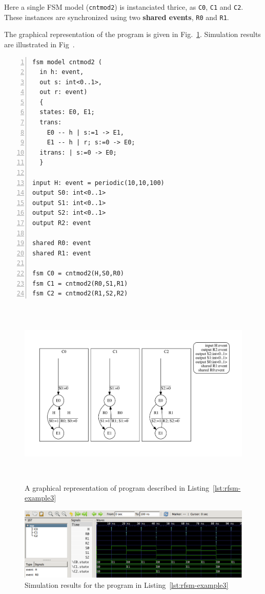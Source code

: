 \medskip
Here a single FSM model (\texttt{cntmod2}) is instanciated thrice, as \texttt{C0}, \texttt{C1} and
\texttt{C2}. These instances are synchronized using two \textbf{shared events}, \texttt{R0} and \texttt{R1}. 

\medskip
The graphical representation of the program is given in Fig.~\ref{fig:rfsm-example3-top}. Simulation
results are illustrated in Fig~\pageref{fig:rfsm-example3-vcd}. 

\begin{lstlisting}[language=Rfsm,frame=single,numbers=left,caption=A multi-model RFSM
  program,label={lst:rfsm-example3},float]
fsm model cntmod2 (
  in h: event,
  out s: int<0..1>,
  out r: event)
  {
  states: E0, E1;
  trans:
    E0 -- h | s:=1 -> E1,
    E1 -- h | r; s:=0 -> E0;
  itrans: | s:=0 -> E0;
  }

input H: event = periodic(10,10,100)
output S0: int<0..1>
output S1: int<0..1>
output S2: int<0..1>
output R2: event

shared R0: event
shared R1: event

fsm C0 = cntmod2(H,S0,R0) 
fsm C1 = cntmod2(R0,S1,R1) 
fsm C2 = cntmod2(R1,S2,R2) 
\end{lstlisting}

\begin{figure}[h]
   \includegraphics[height=9cm]{figs/ctrmod8-top}
   \centering
  \caption{A graphical representation of program described in Listing~\ref{lst:rfsm-example3}}
  \label{fig:rfsm-example3-top}
\end{figure}

\begin{figure}[h]
   \includegraphics[width=\textwidth]{figs/ctrmod8-chrono}
   \centering
  \caption{Simulation results for the program in Listing~\ref{lst:rfsm-example3}}
  \label{fig:rfsm-example3-vcd}
\end{figure}

